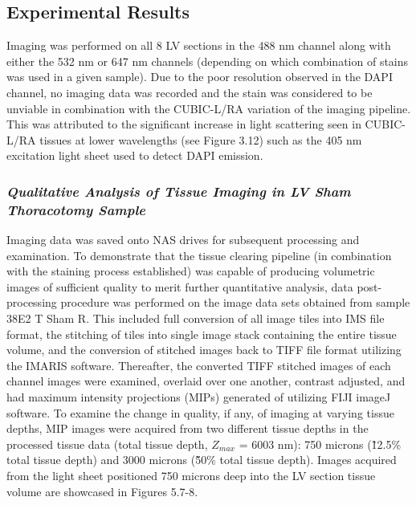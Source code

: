 \subsection{Experimental Results}
Imaging was performed on all 8 LV sections in the 488 nm channel along with either the 532 nm or 647 nm channels (depending on which combination of stains was used in a given sample). Due to the poor resolution observed in the DAPI channel, no imaging data was recorded and the stain was considered to be unviable in combination with the CUBIC-L/RA variation of the imaging pipeline. This was attributed to the significant increase in light scattering seen in CUBIC-L/RA tissues at lower wavelengths (see Figure 3.12) such as the 405 nm excitation light sheet used to detect DAPI emission.

\subsubsection{\textit{Qualitative Analysis of Tissue Imaging in LV Sham Thoracotomy Sample}}
Imaging data was saved onto NAS drives for subsequent processing and examination. To demonstrate that the tissue clearing pipeline (in combination with the staining process established) was capable of producing volumetric images of sufficient quality to merit further quantitative analysis, data post-processing procedure was performed on the image data sets obtained from sample 38E2 T Sham R. This included full conversion of all image tiles into IMS file format, the stitching of tiles into single image stack containing the entire tissue volume, and the conversion of stitched images back to TIFF file format utilizing the IMARIS software. Thereafter, the converted TIFF stitched images of each channel images were examined, overlaid over one another, contrast adjusted, and had maximum intensity projections (MIPs) generated of utilizing FIJI imageJ software. To examine the change in quality, if any, of imaging at varying tissue depths, MIP images were acquired from two different tissue depths in the processed tissue data (total tissue depth, $Z_{max}$ = 6003 nm): 750 microns (\~12.5\% total tissue depth) and 3000 microns (\~50\% total tissue depth). Images acquired from the light sheet positioned 750 microns deep into the LV section tissue volume are showcased in Figures 5.7-8. 



